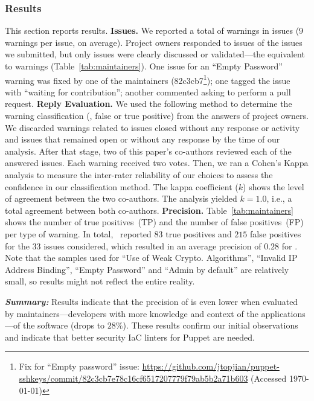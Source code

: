 \subsubsection{Results} This section reports results. \textbf{Issues.} We
reported a total of \botTotalWarnings{} warnings in \botTotalIssues{} issues
($9$ warnings per issue, on average). Project owners responded 
to \botTotalIssuesAnswers{} issues of the \botTotalIssues{}
issues we submitted, but only \botFinalIssues{} issues were clearly discussed 
or validated---the equivalent to \botTotalAnswered{} warnings (Table~\ref{tab:maintainers}). One issue for an
``Empty Password'' warning was fixed by one of the maintainers
(82c3cb7\footnote{Fix for ``Empty password'' issue: \url{https://github.com/jtopjian/puppet-sshkeys/commit/82c3cb7e78c16cf6517207779f79ab5b2a71b603} (Accessed \today)});
one tagged the issue with ``waiting for contribution''; another commented asking to perform a pull request. \textbf{Reply
  Evaluation.} We used the following method to determine the warning
classification (\ie{}, false or true positive) from the answers of
project owners. We discarded warnings related to issues closed without
any response or activity and issues that remained open or without any
response by the time of our analysis. After that stage, two of this paper's co-authors reviewed each of the answered
issues. Each warning received two votes. Then, we ran a Cohen's Kappa
analysis to measure the inter-rater reliability of our choices to
assess the confidence in our classification method. The kappa
coefficient ($k$) shows the level of agreement between the two
co-authors. The analysis yielded $k=1.0$, i.e., a total agreement 
between both co-authors. \textbf{Precision.} Table~\ref{tab:maintainers} shows the
number of true positives~(TP) and the number of false positives~(FP) per
type of warning. In total, \slic\ reported $83$ true positives and
$215$ false positives for the $33$ issues considered, which resulted in
an average precision of $0.28$ for \slic{}. Note that the samples used for 
``Use of Weak Crypto. Algorithms'', ``Invalid IP Address Binding'', ``Empty Password'' and 
``Admin by default'' are relatively small, so results might not reflect the entire reality. 


\textit{\textbf{Summary:}} Results indicate that the precision of
\slic{} is even lower when evaluated by maintainers---developers with 
more knowledge and context of the applications---of the software (drops to $28\%$).
These results confirm our initial observations and indicate that 
better security IaC linters for Puppet are needed.

